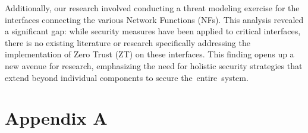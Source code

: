 \documentclass{report}
\begin{document}
    Additionally, our research involved conducting a threat modeling exercise for the interfaces connecting the various Network Functions (NFs). This analysis revealed a significant gap: while security measures have been applied to critical interfaces, there is no existing literature or research specifically addressing the implementation of Zero Trust (ZT) on these interfaces. This finding opens up a new avenue for research, emphasizing the need for holistic security strategies that extend beyond individual components to secure the entire system.



\appendix
\section{Appendix A}
\end{document}
